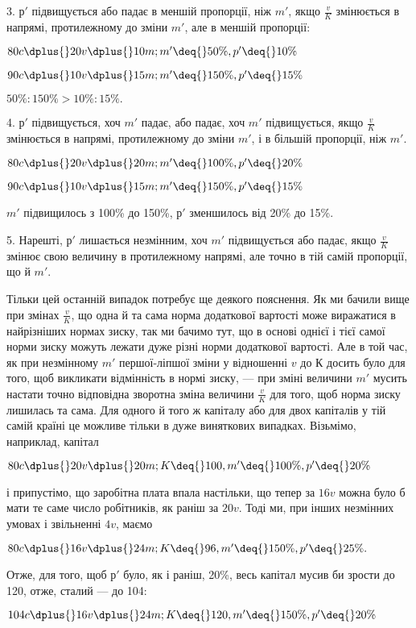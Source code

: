 
3. $р'$ підвищується або падає в меншій пропорції, ніж $m'$,
якщо $\frac{v}{K}$ змінюється в напрямі, протилежному до зміни $m'$, але
в меншій пропорції:

\begin{center}
$80c \dplus{} 20 v \dplus{} 10 m; m' \deq{} 50\%, p' \deq{} 10\%$

$90 c \dplus{} 10 v \dplus{} 15 m; m' \deq{} 150\%, p' \deq{} 15\%$

$50\% : 150\% > 10\% : 15\%.$
\end{center}

4. $р'$ підвищується, хоч $m'$ падає, або падає, хоч $m'$ підвищується,
якщо $\frac{v}{K}$ змінюється в напрямі, протилежному до зміни
$m'$, і в більшій пропорції, ніж $m'$.

\begin{center}
$80c \dplus{} 20 v \dplus{} 20 m; m' \deq{} 100\%, p' \deq{} 20\%$

$90 c \dplus{} 10 v \dplus{} 15 m; m' \deq{} 150\%, p' \deq{} 15\%$
\end{center}

\noindent $m'$ підвищилось з 100\% до 150\%, $р'$ зменшилось від 20\% до 15\%.

5. Нарешті, $р'$ лишається незмінним, хоч $m'$ підвищується або
падає, якщо $\frac{v}{K}$ змінює свою величину в протилежному напрямі,
але точно в тій самій пропорції, що й $m'$.

Тільки цей останній випадок потребує ще деякого пояснення.
Як ми бачили вище при змінах $\frac{v}{K}$, що одна й та сама норма
додаткової вартості може виражатися в найрізніших нормах
зиску, так ми бачимо тут, що в основі однієї і тієї самої норми
зиску можуть лежати дуже різні норми додаткової вартості.
Але в той час, як при незмінному $m'$ першої-ліпшої зміни у відношенні
$v$ до $К$ досить було для того, щоб викликати відмінність
в нормі зиску, $—$ при зміні величини $m'$ мусить настати точно
відповідна зворотна зміна величини $\frac{v}{K}$ для того, щоб норма
зиску лишилась та сама. Для одного й того ж капіталу або для
двох капіталів у тій самій країні це можливе тільки в дуже
виняткових випадках. Візьмімо, наприклад, капітал

\begin{center}
$80c \dplus{} 20 v \dplus{} 20 m; K \deq{} 100, m' \deq{} 100\%, p' \deq{} 20\%$
\end{center}

\noindent і припустімо, що заробітна плата впала настільки, що тепер за
$16 v$ можна було б мати те саме число робітників, як раніш за
$20 v$. Тоді ми, при інших незмінних умовах і звільненні $4 v$,
маємо

\begin{center}
$80c \dplus{} 16 v \dplus{} 24 m; K \deq{} 96, m' \deq{} 150\%, p' \deq{} 25\%.$
\end{center}

Отже, для того, щоб $р'$ було, як і раніш, \deq{} 20\%, весь капітал
мусив би зрости до 120, отже, сталий $—$ до 104:

\begin{center}
$104 c \dplus{} 16 v \dplus{} 24 m; K \deq{} 120, m' \deq{} 150\%, p' \deq{} 20\%$
\end{center}
